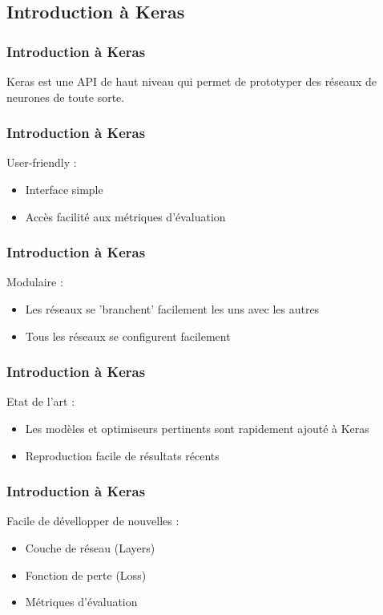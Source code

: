 \subsection{Introduction à Keras}



\begin{frame}
  \frametitle{Introduction à Keras}
  Keras est une API de haut niveau qui permet de prototyper des réseaux de neurones de toute sorte.
\end{frame}

\begin{frame}
  \frametitle{Introduction à Keras}
  User-friendly :
  \begin{itemize}
  \item Interface simple
  \item Accès facilité aux métriques d'évaluation
  \end{itemize}
\end{frame}

\begin{frame}
  \frametitle{Introduction à Keras}
  Modulaire :
  \begin{itemize}
  \item Les réseaux se 'branchent' facilement les uns avec les autres
  \item Tous les réseaux se configurent facilement
  \end{itemize}
\end{frame}

\begin{frame}
  \frametitle{Introduction à Keras}
  Etat de l'art :
  \begin{itemize}
  \item Les modèles et optimiseurs pertinents sont rapidement ajouté à Keras
  \item Reproduction facile de résultats récents
  \end{itemize}
\end{frame}

\begin{frame}
  \frametitle{Introduction à Keras}
  Facile de dévellopper de nouvelles :
  \begin{itemize}
  \item Couche de réseau (Layers)
  \item Fonction de perte (Loss)
  \item Métriques d'évaluation
  \end{itemize}
\end{frame}

